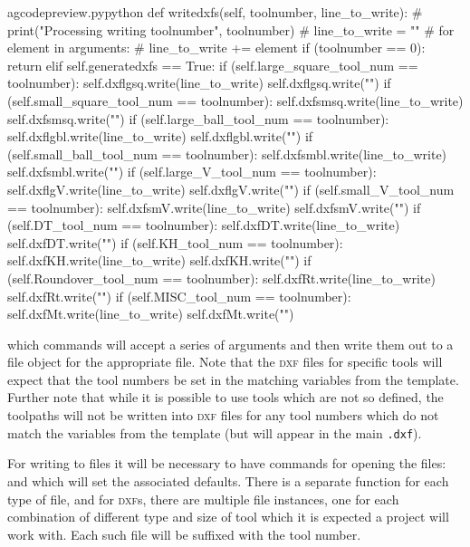 \documentclass{ltxdoc}
\begin{document}
\begin{writecode}{a}{gcodepreview.py}{python}
    def writedxfs(self, toolnumber, line_to_write):
#        print("Processing writing toolnumber", toolnumber)
#        line_to_write = ""
#        for element in arguments:
#            line_to_write += element
        if (toolnumber == 0):
            return
        elif self.generatedxfs == True:
            if (self.large_square_tool_num == toolnumber):
                self.dxflgsq.write(line_to_write)
                self.dxflgsq.write("\n")
            if (self.small_square_tool_num == toolnumber):
                self.dxfsmsq.write(line_to_write)
                self.dxfsmsq.write("\n")
            if (self.large_ball_tool_num == toolnumber):
                self.dxflgbl.write(line_to_write)
                self.dxflgbl.write("\n")
            if (self.small_ball_tool_num == toolnumber):
                self.dxfsmbl.write(line_to_write)
                self.dxfsmbl.write("\n")
            if (self.large_V_tool_num == toolnumber):
                self.dxflgV.write(line_to_write)
                self.dxflgV.write("\n")
            if (self.small_V_tool_num == toolnumber):
                self.dxfsmV.write(line_to_write)
                self.dxfsmV.write("\n")
            if (self.DT_tool_num == toolnumber):
                self.dxfDT.write(line_to_write)
                self.dxfDT.write("\n")
            if (self.KH_tool_num == toolnumber):
                self.dxfKH.write(line_to_write)
                self.dxfKH.write("\n")
            if (self.Roundover_tool_num == toolnumber):
                self.dxfRt.write(line_to_write)
                self.dxfRt.write("\n")
            if (self.MISC_tool_num == toolnumber):
                self.dxfMt.write(line_to_write)
                self.dxfMt.write("\n")

\end{writecode}
\addtocounter{gcpy}{59}

\noindent which commands will accept a series of arguments and then write them out to a file object for the appropriate file. Note that the \textsc{dxf} files for specific tools will expect that the tool numbers be set in the matching variables from the template. Further note that while it is possible to use tools which are not so defined, the toolpaths will not be written into \textsc{dxf} files for any tool numbers which do not match the variables from the template (but will appear in the main \verb|.dxf|).
 
For writing to files it will be necessary to have commands for opening the files:  and  which will set the associated defaults. There is a separate function for each type of file, and for \textsc{dxf}s, there are multiple file instances, one for each combination of different type and size of tool which it is expected a project will work with. Each such file will be suffixed with the tool number.
\end{document}
